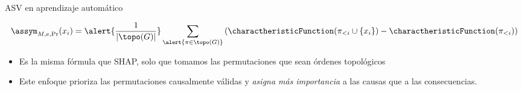 \begin{frame}{ASV en aprendizaje automático}
	
	\begin{mydefinition}
		\[
		\assym_{M,e,\Pr}(x_i) = \alert{\frac{1}{|\topo(G)|}} \sum_{\alert{\pi \in \topo(G)}} \left( \charactheristicFunction(\pi_{<i} \cup \{x_i\}) - \charactheristicFunction(\pi_{<i}) \right)
		\]
	\end{mydefinition}
	\pause
	\begin{itemize}[<+- | alert@+>]
		\item Es la misma fórmula que SHAP, solo que tomamos las permutaciones que sean órdenes topológicos
		\item Este enfoque prioriza las permutaciones causalmente válidas y \textit{asigna más importancia} a las causas que a las consecuencias.
	\end{itemize}
	
\end{frame}

